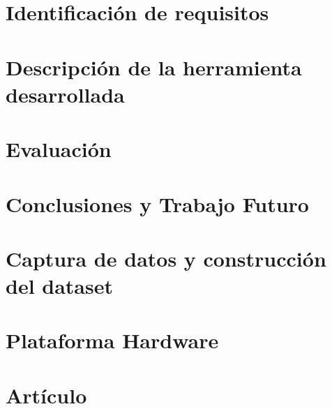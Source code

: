 \documentclass[11pt,a4paper,spanish]{book}
\begin{document}
\chapter{Identificación de requisitos}\label{chap:requisitos}


\chapter{Descripción de la herramienta desarrollada}\label{chap:descripcion}


\chapter{Evaluación}\label{chap:eval}


\chapter{Conclusiones y Trabajo Futuro}\label{chap:conclusiones}


%




\appendix

\chapter{Captura de datos y construcción del dataset}\label{app:dataset}


\chapter{Plataforma Hardware}\label{app:plataforma}


\chapter{Artículo}

\newpage
\end{document}
